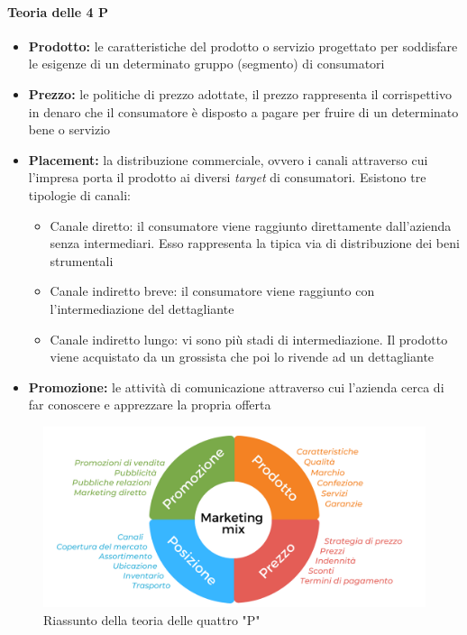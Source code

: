 \paragraph{Teoria delle 4 P}
\begin{itemize}
	\item \textbf{Prodotto:} le caratteristiche del prodotto o servizio progettato per soddisfare le esigenze di un determinato gruppo (segmento) di consumatori
	\item \textbf{Prezzo:} le politiche di prezzo adottate, il prezzo rappresenta il corrispettivo in denaro che il consumatore è disposto a pagare per fruire di un determinato bene o servizio
	\item \textbf{Placement:} la distribuzione commerciale, ovvero i canali attraverso cui l'impresa porta il prodotto ai diversi \textit{target} di consumatori. Esistono tre tipologie di canali:
		\begin{itemize}
			\item Canale diretto: il consumatore viene raggiunto direttamente dall’azienda senza intermediari. Esso rappresenta la tipica via di distribuzione dei beni strumentali
			\item Canale indiretto breve: il consumatore viene raggiunto con l’intermediazione del dettagliante
			\item Canale indiretto lungo: vi sono più stadi di intermediazione. Il prodotto viene acquistato da un grossista che poi lo rivende ad un dettagliante
		\end{itemize}
	\item \textbf{Promozione:} le attività di comunicazione attraverso cui l'azienda cerca di far conoscere e apprezzare la propria offerta
\end{itemize}

\begin{figure}[h]
	\includegraphics[width=0.7\linewidth]{resources/chapters/OrganizzazioneAziendale/images/pppp.png}
	\centering
	\caption{Riassunto della teoria delle quattro "P"}
\end{figure}